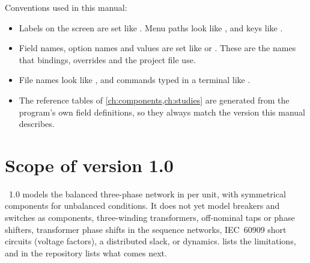 Conventions used in this manual:

\begin{itemize}
  \item Labels on the screen are set like . Menu paths look like
    , and keys like .
  \item Field names, option names and values are set like  or
    . These are the names that bindings, overrides and the project
    file use.
  \item File names look like , and commands typed in a
    terminal like .
  \item The reference tables of \cref{ch:components,ch:studies} are generated from the
    program's own field definitions, so they always match the version this manual
    describes.
\end{itemize}

\section{Scope of version 1.0}

\app~1.0 models the balanced three-phase network in per unit, with symmetrical components
for unbalanced conditions. It does not yet model breakers and switches as components,
three-winding transformers, off-nominal taps or phase shifters, transformer phase shifts
in the sequence networks, IEC~60909 short circuits (voltage factors), a distributed slack,
or dynamics.  lists the limitations, and  in
the repository lists what comes next.
